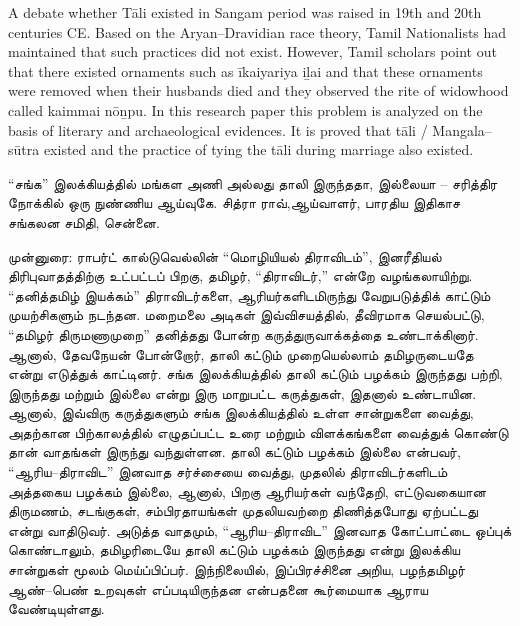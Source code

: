 A debate whether Tāli existed in Sangam period was raised in 19th and 20th centuries CE. Based on the Aryan–Dravidian race theory, Tamil Nationalists had maintained that such practices did not exist. However, Tamil scholars point out that there existed ornaments such as īkaiyariya iḻai and that these ornaments were removed when their husbands died and they observed the rite of widowhood called kaimmai nōṉpu. In this research paper this problem is analyzed on the basis of literary and archaeological evidences. It is proved that tāli / Mangala–sūtra existed and the practice of tying the tāli during marriage also existed.

“சங்க” இலக்கியத்தில் மங்கள அணி அல்லது தாலி இருந்ததா, இல்லையா – சரித்திர நோக்கில் ஒரு நுண்ணிய ஆய்வுகே. சித்ரா ராவ்,ஆய்வாளர், பாரதிய இதிகாச சங்கலன சமிதி, சென்னை.

முன்னுரை: ராபர்ட் கால்டுவெல்லின் “மொழியியல் திராவிடம்”, இனரீதியல் திரிபுவாதத்திற்கு உட்பட்டப் பிறகு, தமிழர், “திராவிடர்,” என்றே வழங்கலாயிற்று. “தனித்தமிழ் இயக்கம்” திராவிடர்களை, ஆரியர்களிடமிருந்து வேறுபடுத்திக் காட்டும் முயற்சிகளும் நடந்தன. மறைமலை அடிகள் இவ்விசயத்தில், தீவிரமாக செயல்பட்டு, “தமிழர் திருமணாமுறை” தனித்தது போன்ற கருத்துருவாக்கத்தை உண்டாக்கினார். ஆனால், தேவநேயன் போன்றோர், தாலி கட்டும் முறையெல்லாம் தமிழருடையதே என்று எடுத்துக் காட்டினர். சங்க இலக்கியத்தில் தாலி கட்டும் பழக்கம் இருந்தது பற்றி, இருந்தது மற்றும் இல்லை என்று இரு மாறுபட்ட கருத்துகள், இதனால் உண்டாயின. ஆனால், இவ்விரு கருத்துகளும் சங்க இலக்கியத்தில் உள்ள சான்றுகளை வைத்து, அதற்கான பிற்காலத்தில் எழுதப்பட்ட உரை மற்றும் விளக்கங்களை வைத்துக் கொண்டு தான் வாதங்கள் இருந்து வந்துள்ளன. தாலி கட்டும் பழக்கம் இல்லை என்பவர், “ஆரிய–திராவிட” இனவாத சர்ச்சையை வைத்து, முதலில் திராவிடர்களிடம் அத்தகைய பழக்கம் இல்லை, ஆனால், பிறகு ஆரியர்கள் வந்தேறி, எட்டுவகையான திருமணம், சடங்குகள், சம்பிரதாயங்கள் முதலியவற்றை திணித்தபோது ஏற்பட்டது என்று வாதிடுவர். அடுத்த வாதமும், “ஆரிய–திராவிட” இனவாத கோட்பாட்டை ஒப்புக் கொண்டாலும், தமிழரிடையே தாலி கட்டும் பழக்கம் இருந்தது என்று இலக்கிய சான்றுகள் மூலம் மெய்ப்பிப்பர். இந்நிலையில், இப்பிரச்சினை அறிய, பழந்தமிழர் ஆண்–பெண் உறவுகள் எப்படியிருந்தன என்பதனை கூர்மையாக ஆராய வேண்டியுள்ளது.

